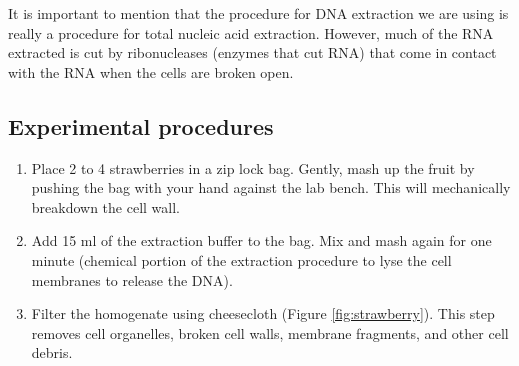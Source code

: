 \documentclass[]{book}
\providecommand{\tightlist}{%
  \setlength{\itemsep}{0pt}\setlength{\parskip}{0pt}}
\begin{document}
It is important to mention that the procedure for DNA extraction we are using is really a procedure for total nucleic acid extraction. However, much of the RNA extracted is cut by ribonucleases (enzymes that cut RNA) that come in contact with the RNA when the cells are broken open.

\hypertarget{experimental-procedures-6}{%
\subsection{Experimental procedures}\label{experimental-procedures-6}}

\begin{enumerate}
\def\labelenumi{\arabic{enumi}.}
\tightlist
\item
  Place 2 to 4 strawberries in a zip lock bag. Gently, mash up the fruit by pushing the bag with your hand against the lab bench. This will mechanically breakdown the cell wall.
\item
  Add 15 ml of the extraction buffer to the bag. Mix and mash again for one minute (chemical portion of the extraction procedure to lyse the cell membranes to release the DNA).
\item
  Filter the homogenate using cheesecloth (Figure \ref{fig:strawberry}). This step removes cell organelles, broken cell walls, membrane fragments, and other cell debris.
\end{enumerate}
\end{document}

